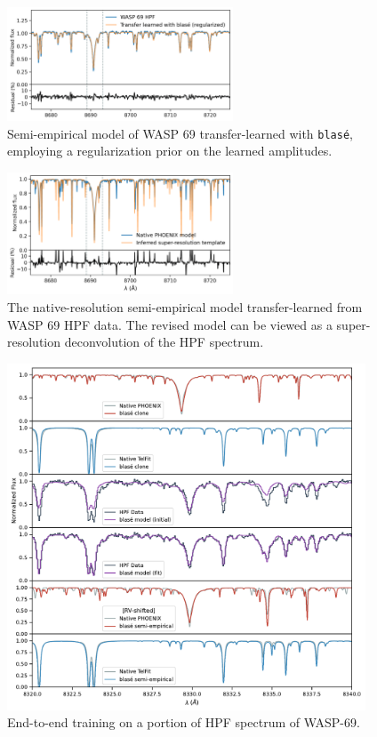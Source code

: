 \documentclass[twocolumn]{aastex631}
\begin{document}
\begin{figure}[hbt!]
    \centering
    \includegraphics[width=0.6\textwidth]{figures/blase_WASP69_regularized.png}
    \caption{Semi-empirical model of WASP 69 transfer-learned with \texttt{blas\'e}, employing a regularization prior on the learned amplitudes.}
    \label{fig_WASP69_transferred}
\end{figure}

\begin{figure}[hbt!]
    \centering
    \includegraphics[width=0.6\textwidth]{figures/blase_super_resolution_template.png}
    \caption{The native-resolution semi-empirical model transfer-learned from WASP 69 HPF data. The revised model can be viewed as a super-resolution deconvolution of the HPF spectrum.}
    \label{fig_WASP69_regularized}
\end{figure}


\begin{figure}[hbt!]
    \centering
    \includegraphics[width=0.95\textwidth]{figures/WASP_69_multi.pdf}
    \caption{End-to-end training on a portion of HPF spectrum of WASP-69.  }
    \label{fig_multi_panel_WASP69}
\end{figure}
\end{document}
